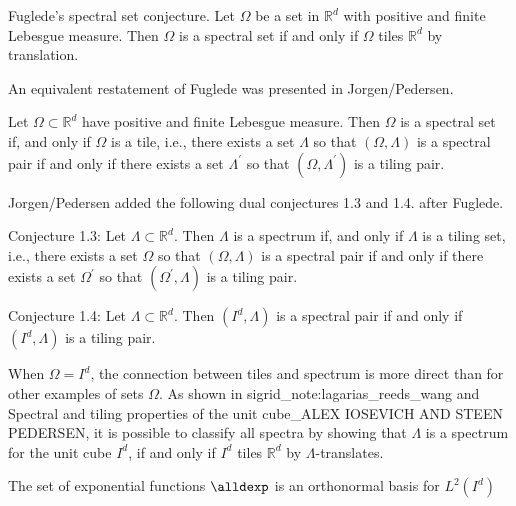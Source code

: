 Fuglede's spectral set conjecture. Let $\Omega$ be a set in $\mathbb{R}^d$ with positive and finite Lebesgue measure. Then $\Omega$ is a spectral set if and only if $\Omega$ tiles $\mathbb{R}^d$ by translation.

An equivalent restatement of Fuglede was presented in Jorgen/Pedersen. 

Let $\Omega \subset \mathbb{R}^d$ have positive and finite Lebesgue measure. Then $\Omega$ is a spectral set if, and only if $\Omega$ is a tile, i.e., there exists a set $\Lambda$ so that $(\Omega, \Lambda)$ is a spectral pair if and only if there exists a set $\Lambda^{\prime}$ so that $\left(\Omega, \Lambda^{\prime}\right)$ is a tiling pair.


Jorgen/Pedersen added the following dual conjectures 1.3 and 1.4. after Fuglede.


Conjecture 1.3: Let $\Lambda \subset \mathbb{R}^d$. Then $\Lambda$ is a spectrum if, and only if $\Lambda$ is a tiling set, i.e., there exists a set $\Omega$ so that $(\Omega, \Lambda)$ is a spectral pair if and only if there exists a set $\Omega^{\prime}$ so that $\left(\Omega^{\prime}, \Lambda\right)$ is a tiling pair.

Conjecture 1.4: Let $\Lambda \subset \mathbb{R}^d$. Then $\left(I^d, \Lambda\right)$ is a spectral pair if and only if $\left(I^d, \Lambda\right)$ is a tiling pair.

When $\Omega = I^d$, the connection between tiles and spectrum is more direct than for other examples of sets $\Omega$. As shown in sigrid_note:lagarias_reeds_wang and Spectral and tiling properties of the unit cube_ALEX IOSEVICH AND STEEN PEDERSEN, it is possible to classify all spectra by showing that $\Lambda$ is a spectrum for the unit cube $I^d$, if and only if $I^d$ tiles $\mathbb{R}^d$ by $\Lambda$-translates.


\begin{lemma}
    The set of exponential functions $\alldexp$ is an orthonormal basis for $L^2(I^d)$
\end{lemma}

